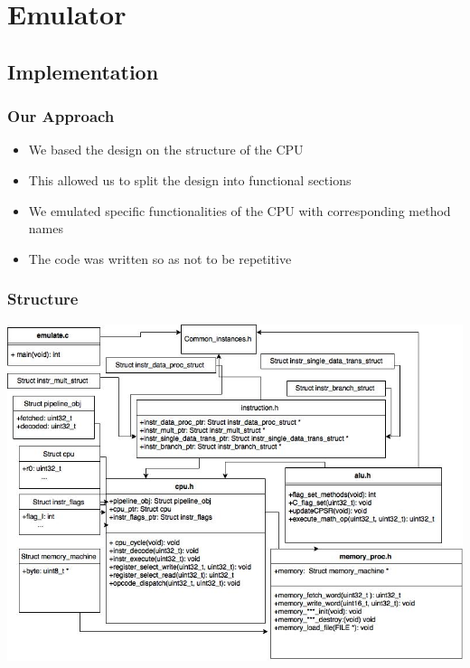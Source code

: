 \documentclass{beamer}
\begin{document}
\section{Emulator} %


\subsection{Implementation} %



\begin{frame}
\frametitle{Our Approach}

\begin{itemize}
\item We based the design on the structure of the CPU
\item This allowed us to split the design into functional sections
\item We emulated specific functionalities of the CPU with corresponding method names
\item The code was written so as not to be repetitive 
\end{itemize}

\end{frame}
\begin{frame}
\frametitle{Structure}
\includegraphics[width=0.9\linewidth]{Images/Emulator_XML(2).jpg}
\end{frame}
\end{document}

